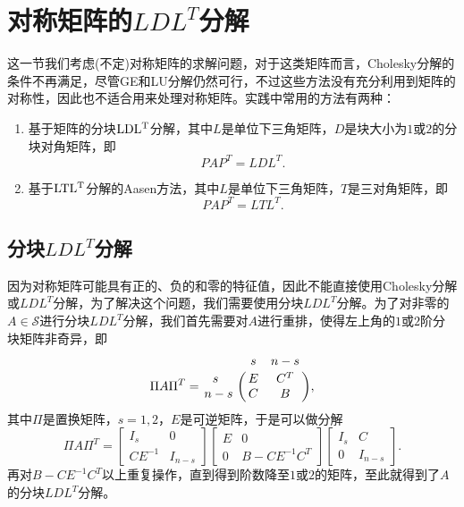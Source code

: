 \documentclass[a4paper,10pt]{ctexart}
\begin{document}
\section{对称矩阵的\texorpdfstring{$ LDL^T $}{LDL-T}分解}
这一节我们考虑(不定)对称矩阵的求解问题，对于这类矩阵而言，Cholesky分解的条件不再满足，尽管GE和LU分解仍然可行，不过这些方法没有充分利用到矩阵的对称性，因此也不适合用来处理对称矩阵。实践中常用的方法有两种：
\begin{enumerate}
    \item 基于矩阵的分块$ {\rm LDL^T} $分解，其中$ L $是单位下三角矩阵，$ D $是块大小为$ 1 $或$ 2 $的分块对角矩阵，即
    \[
        PAP^T = LDL^T.
    \]
    \item 基于$ {\rm LTL^T} $分解的Aasen方法，其中$ L $是单位下三角矩阵，$ T $是三对角矩阵，即
    \[
        PAP^T = LTL^T.
    \]
\end{enumerate}

\subsection{分块\texorpdfstring{$ LDL^T $}{LDL-T}分解}
因为对称矩阵可能具有正的、负的和零的特征值，因此不能直接使用Cholesky分解或$ {LDL^T} $分解，为了解决这个问题，我们需要使用分块$ {LDL^T} $分解。为了对非零的$ A\in \mathcal{S} $进行分块$ {LDL^T} $分解，我们首先需要对$ A $进行重排，使得左上角的$ 1 $或$ 2 $阶分块矩阵非奇异，即
\begin{equation}
    \Pi A \Pi^T = 
    \bordermatrix{
            & s & n-s \cr
            \ \ s & E & C^T \cr
            n-s & C & B
        },
\end{equation}
其中$ \Pi $是置换矩阵，$ s=1,2 $，$ E $是可逆矩阵，于是可以做分解
\begin{equation}
    \Pi A \Pi^T = 
    \begin{bmatrix} 
        I_s & 0 \\ CE^{-1} & I_{n-s}
    \end{bmatrix}
    \begin{bmatrix} 
        E & 0 \\ 0 & B-CE^{-1}C^T
    \end{bmatrix}
    \begin{bmatrix} 
        I_s & C \\ 0 & I_{n-s}
    \end{bmatrix}.
\end{equation}
再对$ B-CE^{-1}C^T $以上重复操作，直到得到阶数降至$ 1 $或$ 2 $的矩阵，至此就得到了$ A $的分块$ {LDL^T} $分解。
\end{document}

